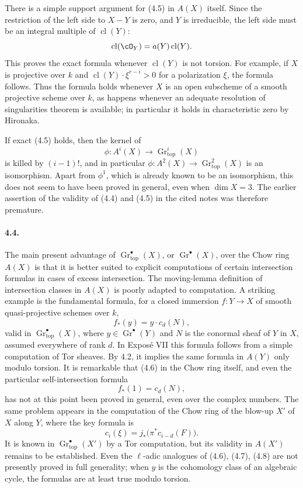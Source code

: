 \documentclass[11pt]{article}
\theoremstyle{plain}
\theoremstyle{definition}
\theoremstyle{remark}
\DeclareMathOperator{\Gr}{Gr}
\DeclareMathOperator{\cl}{cl}
\providecommand{\topf}{\mathrm{top}}
\begin{document}
There is a simple support argument for (4.5) in $A(X)$ itself. Since the restriction of the left side to $X-Y$ is zero, and $Y$ is irreducible, the left side must be an integral multiple of $\cl(Y)$:
\[
\cl(\cO_Y)=a(Y)\cl(Y).
\]
This proves the exact formula whenever $\cl(Y)$ is not torsion. For example, if $X$ is projective over $k$ and $\cl(Y)\cdot \xi^{r-i}>0$ for a polarization $\xi$, the formula follows. Thus the formula holds whenever $X$ is an open subscheme of a smooth projective scheme over $k$, as happens whenever an adequate resolution of singularities theorem is available; in particular it holds in characteristic zero by Hironaka.

If exact (4.5) holds, then the kernel of
\[
\phi:A^i(X)\to \Gr^i_{\topf}(X)
\]
is killed by $(i-1)!$, and in particular $\phi:A^2(X)\to \Gr^2_{\topf}(X)$ is an isomorphism. Apart from $\phi^1$, which is already known to be an isomorphism, this does not seem to have been proved in general, even when $\dim X=3$. The earlier assertion of the validity of (4.4) and (4.5) in the cited notes was therefore premature.

\paragraph{4.4.}
The main present advantage of $\Gr^\bullet_{\topf}(X)$, or $\Gr^\bullet(X)$, over the Chow ring $A(X)$ is that it is better suited to explicit computations of certain intersection formulas in cases of excess intersection. The moving-lemma definition of intersection classes in $A(X)$ is poorly adapted to computation. A striking example is the fundamental formula, for a closed immersion $f:Y\to X$ of smooth quasi-projective schemes over $k$,
\[
f_*(y)=y\cdot c_d(N),
\tag{4.6}
\]
valid in $\Gr^\bullet_{\topf}(X)$, where $y\in \Gr^\bullet(Y)$ and $N$ is the conormal sheaf of $Y$ in $X$, assumed everywhere of rank $d$. In Exposé VII this formula follows from a simple computation of Tor sheaves. By 4.2, it implies the same formula in $A(Y)$ only modulo torsion. It is remarkable that (4.6) in the Chow ring itself, and even the particular self-intersection formula
\[
f_*(1)=c_d(N),
\tag{4.7}
\]
has not at this point been proved in general, even over the complex numbers. The same problem appears in the computation of the Chow ring of the blow-up $X'$ of $X$ along $Y$, where the key formula is
\[
c_i(\xi)=j_*\bigl(\pi^*c_{i-d}(F)\bigr).
\tag{4.8}
\]
It is known in $\Gr^\bullet_{\topf}(X')$ by a Tor computation, but its validity in $A(X')$ remains to be established. Even the $\ell$-adic analogues of (4.6), (4.7), (4.8) are not presently proved in full generality; when $y$ is the cohomology class of an algebraic cycle, the formulas are at least true modulo torsion.
\end{document}
